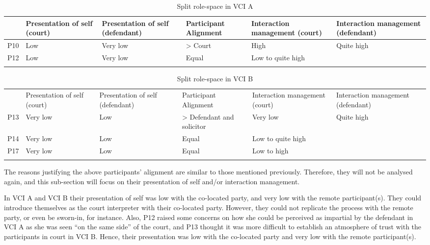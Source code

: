 \documentclass[output=paper]{langsci/langscibook}
\begin{document}
\begin{table}
\begin{tabularx}{\textwidth}{XXXXXX}
	\lsptoprule
& {Presentation of self (court)} & {Presentation of self (defendant)} & {Participant Alignment} & {Interaction management (court)} & {Interaction management (defendant)}\\\midrule
P10 & Low & Very low & > Court & High & Quite high\\
P12 & Low & Very low & Equal & \multicolumn{2}{X}{Low to quite high}\\
\lspbottomrule
\end{tabularx}
\caption{Split role-space in \textsc{VCI} A\label{tab:devaux:4}}
\end{table}

\begin{table}
\begin{tabularx}{\textwidth}{XXXXXX}
\lsptoprule
& {Presentation of self (court)} & {Presentation of self (defendant)} & {Participant Alignment} & \multicolumn{1}{X}{{Interaction management (court)}} & {Interaction management (defendant)}\\

P13 & Very low & Low & > Defendant and solicitor & \multicolumn{1}{X}{Very low} & Quite high\\
P14 & Very low & Low & Equal & \multicolumn{2}{X}{Low to quite high} \\
P17 & Very low & Low & Equal & \multicolumn{2}{X}{Low to high}\\
\lspbottomrule
\end{tabularx}

\caption{Split role-space in \textsc{VCI} B\label{tab:devaux:5}}
\end{table}

The reasons justifying the above participants’ alignment are similar to those mentioned previously. Therefore, they will not be analysed again, and this sub-section will focus on their presentation of self and/or interaction management.

In \textsc{VCI} A and \textsc{VCI} B their presentation of self was low with the co-located party, and very low with the remote participant(s). They could introduce themselves as the court interpreter with their co-located party. However, they could not replicate the process with the remote party, or even be sworn-in, for instance. Also, P12 raised some concerns on how she could be perceived as impartial by the defendant in \textsc{VCI} A as she was seen “on the same side” of the court, and P13 thought it was more difficult to establish an atmosphere of trust with the participants in court in \textsc{VCI} B. Hence, their presentation was low with the co-located party and very low with the remote participant(s).
\end{document}
